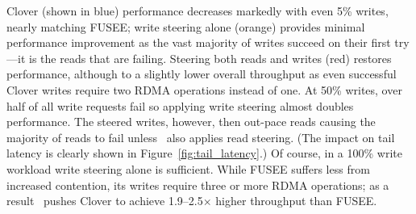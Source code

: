 
Clover (shown in blue) performance
decreases markedly with even 5\% writes, nearly matching FUSEE; write steering
alone (orange) provides minimal performance improvement as
the vast majority of writes succeed on their first try---it
is the reads that are failing.  Steering both reads and
writes (red) restores performance, although to a slightly
lower overall throughput as even successful Clover writes
require two RDMA operations instead of one.
%
%
At 50\% writes, over half of all write requests fail so
applying write steering almost doubles performance.  The
steered writes, however, then out-pace reads causing the
majority of reads to fail unless \sword\ also applies read
steering.  (The impact on tail latency is clearly shown in
Figure~\ref{fig:tail_latency}.)  Of course, in a 100\% write
workload write steering alone is sufficient.  While FUSEE
suffers less from increased contention, its writes require three
or more RDMA operations; as a result \sword\ pushes Clover to achieve 1.9--2.5$\times$ higher
throughput than FUSEE.


%
%







